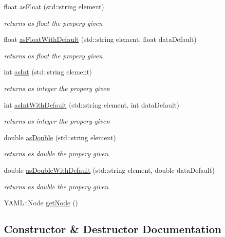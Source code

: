 \begin{DoxyCompactItemize}
float \hyperlink{class_config_1_1_properties_a82dc1305eac3b4e68d776b868d03c599}{as\+Float} (std\+::string element)
\begin{DoxyCompactList}\small\item\em returns as float the propery given \end{DoxyCompactList}\item 
float \hyperlink{class_config_1_1_properties_a30c642acc0904cf510825bf29034eb95}{as\+Float\+With\+Default} (std\+::string element, float data\+Default)
\begin{DoxyCompactList}\small\item\em returns as float the propery given \end{DoxyCompactList}\item 
int \hyperlink{class_config_1_1_properties_aa30deb695b2a7ca89332c9db746efc07}{as\+Int} (std\+::string element)
\begin{DoxyCompactList}\small\item\em returns as integer the propery given \end{DoxyCompactList}\item 
int \hyperlink{class_config_1_1_properties_a513b23817b03c01443252a58aea17fc1}{as\+Int\+With\+Default} (std\+::string element, int data\+Default)
\begin{DoxyCompactList}\small\item\em returns as integer the propery given \end{DoxyCompactList}\item 
double \hyperlink{class_config_1_1_properties_a5577e668732a41e58b9852cb59f4400b}{as\+Double} (std\+::string element)
\begin{DoxyCompactList}\small\item\em returns as double the propery given \end{DoxyCompactList}\item 
double \hyperlink{class_config_1_1_properties_ac482a248dab5d785c38a883ad6053062}{as\+Double\+With\+Default} (std\+::string element, double data\+Default)
\begin{DoxyCompactList}\small\item\em returns as double the propery given \end{DoxyCompactList}\item 
Y\+A\+M\+L\+::\+Node \hyperlink{class_config_1_1_properties_a78436b0ab5445a34caf14b7141046d8a}{get\+Node} ()
\end{DoxyCompactItemize}


\subsection{Constructor \& Destructor Documentation}
\mbox{\label{class_config_1_1_properties_a86d9801a1b37443c70bd8985afe81a46}} 
